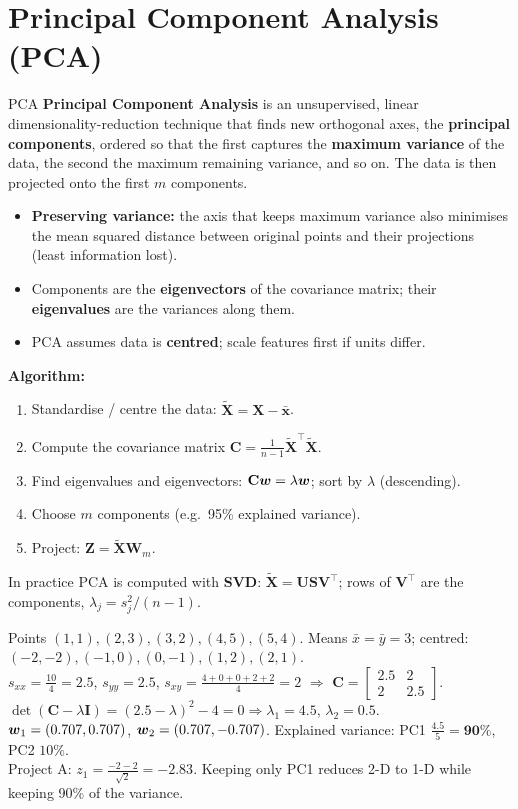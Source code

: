\section{Principal Component Analysis (PCA)}
\begin{dfn}{PCA}
\textbf{Principal Component Analysis} is an unsupervised, linear dimensionality-reduction technique that finds new orthogonal axes, the \textbf{principal components}, ordered so that the first captures the \textbf{maximum variance} of the data, the second the maximum remaining variance, and so on. The data is then projected onto the first $m$ components.
\end{dfn}
\begin{itemize}
  \item \textbf{Preserving variance:} the axis that keeps maximum variance also minimises the mean squared distance between original points and their projections (least information lost).
  \item Components are the \textbf{eigenvectors} of the covariance matrix; their \textbf{eigenvalues} are the variances along them.
  \item PCA assumes data is \textbf{centred}; scale features first if units differ.
\end{itemize}
\textbf{Algorithm:}
\begin{enumerate}
  \item Standardise / centre the data: $\tilde{\mathbf X}=\mathbf X-\bar{\mathbf x}$.
  \item Compute the covariance matrix $\mathbf C=\frac1{n-1}\tilde{\mathbf X}^{\!\top}\tilde{\mathbf X}$.
  \item Find eigenvalues and eigenvectors: $\mathbf C\boldsymbol{w}=\lambda\boldsymbol{w}$; sort by $\lambda$ (descending).
  \item Choose $m$ components (e.g.\ 95\% explained variance).
  \item Project: $\mathbf Z=\tilde{\mathbf X}\mathbf W_m$.
\end{enumerate}
In practice PCA is computed with \textbf{SVD}: $\tilde{\mathbf X}=\mathbf U\mathbf S\mathbf V^{\!\top}$; rows of $\mathbf V^{\!\top}$ are the components, $\lambda_j=s_j^2/(n-1)$.

\begin{numer}
Points $(1,1),(2,3),(3,2),(4,5),(5,4)$. Means $\bar x=\bar y=3$; centred: $(-2,-2),(-1,0),(0,-1),(1,2),(2,1)$.\\
$s_{xx}=\frac{10}4=2.5$, $s_{yy}=2.5$, $s_{xy}=\frac{4+0+0+2+2}4=2$ $\Rightarrow$ $\mathbf C=\left[\begin{smallmatrix}2.5&2\\2&2.5\end{smallmatrix}\right]$.\\
$\det(\mathbf C-\lambda\mathbf I)=(2.5-\lambda)^2-4=0\Rightarrow\lambda_1=4.5$, $\lambda_2=0.5$.\\
$\boldsymbol{w}_1=(0.707,0.707)$, $\boldsymbol{w}_2=(0.707,-0.707)$. Explained variance: PC1 $\frac{4.5}{5}=\mathbf{90\%}$, PC2 $10\%$.\\
Project A: $z_1=\frac{-2-2}{\sqrt2}=-2.83$. Keeping only PC1 reduces 2-D to 1-D while keeping 90\% of the variance.
\end{numer}

